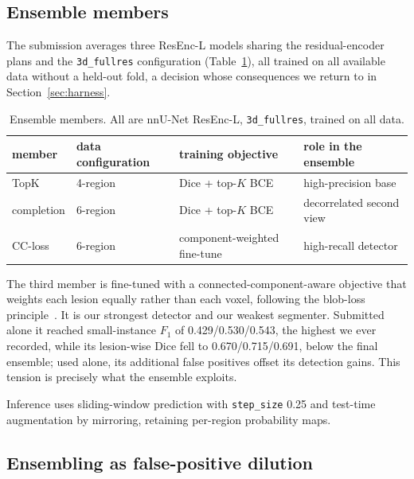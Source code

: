 \documentclass[runningheads]{llncs}
\begin{document}
\subsection{Ensemble members}
\label{sec:members}

The submission averages three ResEnc-L models sharing the residual-encoder plans and the
\texttt{3d\_fullres} configuration (Table~\ref{tab:members}), all trained on all available
data without a held-out fold, a decision whose consequences we return to in
Section~\ref{sec:harness}.

\begin{table}[t]
\centering
\caption{Ensemble members. All are nnU-Net ResEnc-L, \texttt{3d\_fullres}, trained on all data.}
\label{tab:members}
\begin{tabular}{@{}llll@{}}
\toprule
member & data configuration & training objective & role in the ensemble \\
\midrule
TopK        & 4-region  & Dice + top-$K$ BCE          & high-precision base \\
completion  & 6-region  & Dice + top-$K$ BCE          & decorrelated second view \\
CC-loss     & 6-region  & component-weighted fine-tune & high-recall detector \\
\bottomrule
\end{tabular}
\end{table}

The third member is fine-tuned with a connected-component-aware objective that weights each
lesion equally rather than each voxel, following the blob-loss
principle~\cite{kofler2022blob,kundu2026instance}.
It is our strongest detector and our weakest segmenter. Submitted alone it reached small-instance
$F_1$ of 0.429/0.530/0.543, the highest we ever recorded, while its lesion-wise Dice fell to
0.670/0.715/0.691, below the final ensemble; used alone, its additional false positives offset its detection gains. This
tension is precisely what the ensemble exploits.

Inference uses sliding-window prediction with \texttt{step\_size} 0.25 and test-time
augmentation by mirroring, retaining per-region probability maps.

\subsection{Ensembling as false-positive dilution}
\label{sec:ensembling}
\end{document}
